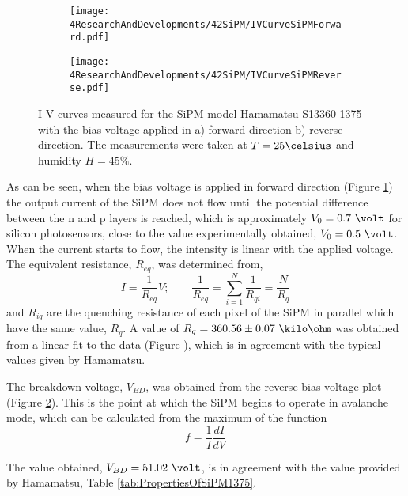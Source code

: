 \begin{figure}
\centering
    \begin{subfigure}[b]{0.9\textwidth}
    \centering
    \texttt{[image: 4ResearchAndDevelopments/42SiPM/IVCurveSiPMForward.pdf]}  
    \caption{\label{subfig:IVcurveForward}}
    \end{subfigure}
    \hfill
    \begin{subfigure}[b]{0.9\textwidth}
    \centering
    \texttt{[image: 4ResearchAndDevelopments/42SiPM/IVCurveSiPMReverse.pdf]}  
    \caption{\label{subfig:IVcurveReverse}}
    \end{subfigure}
 \caption{I-V curves measured for the SiPM model Hamamatsu S13360-1375 with the bias voltage applied in a) forward direction b) reverse direction. The measurements were taken at $T=25\celsius$ and humidity $H=45\%$.}
 \label{fig:IVcurveSiPM}
\end{figure}

As can be seen, when the bias voltage is applied in forward direction (Figure \ref{subfig:IVcurveForward}) the output current of the SiPM does not flow until the potential difference between the n and p layers is reached, which is approximately $V_0=0.7~\volt$ for silicon photosensors, close to the value experimentally obtained, $V_0= 0.5~\volt$. When the current starts to flow, the intensity is linear with the applied voltage. The equivalent resistance, $R_{eq}$, was determined from, 
\begin{equation}
I=\frac{1}{R_{eq}}V;  \qquad \frac{1}{R_{eq}} = \sum_{i=1}^{N}\frac{1}{R_{qi}}= \frac{N}{R_{q}}
\label{QuenchingResistance}
\end{equation}
and $R_{iq}$ are the quenching resistance of each pixel of the SiPM in parallel which have the same value, $R_{q}$. A value of $R_{q}= 360.56 \pm 0.07~\kilo\ohm$ was obtained from a linear fit to the data (Figure ), which is in agreement with the typical values given by Hamamatsu.

The breakdown voltage, $V_{BD}$, was obtained from the reverse bias voltage plot (Figure \ref{subfig:IVcurveReverse}). This is the point at which the SiPM begins to operate in avalanche mode, which can be calculated from the maximum of the function 
\begin{equation}
f=\frac{1}{I}\frac{dI}{dV}
\label{BreakDownVoltageFunction}
\end{equation}

The value obtained, $V_{BD}=51.02~\volt$, is in agreement with the value provided by Hamamatsu, Table \ref{tab:PropertiesOfSiPM1375}.

